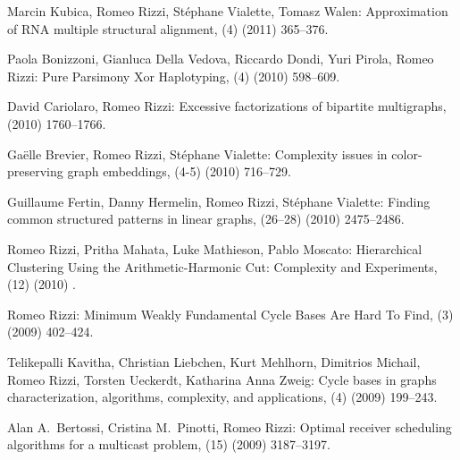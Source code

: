 \begin{etaremune}
  \item {Marcin Kubica, Romeo Rizzi, St\'ephane Vialette, Tomasz Walen:}
   \newblock Approximation of RNA multiple structural alignment,
   (4) (2011) 365--376.

  \item {\sc Paola Bonizzoni, Gianluca Della Vedova, Riccardo Dondi, Yuri Pirola, Romeo Rizzi:}
   \newblock  Pure Parsimony Xor Haplotyping,
   (4) (2010) 598--609.

  \item {\sc David Cariolaro, Romeo Rizzi:}
   \newblock  Excessive factorizations of bipartite multigraphs,
    (2010) 1760--1766.

  \item {\sc Ga\"elle Brevier, Romeo Rizzi, St\'ephane Vialette:}
   \newblock   Complexity issues in color-preserving graph embeddings,
   (4-5) (2010) 716--729.

  \item {\sc Guillaume Fertin, Danny Hermelin, Romeo Rizzi, St\'ephane Vialette:}
   \newblock  Finding common structured patterns in linear graphs,
   (26--28) (2010) 2475--2486.

  \item {\sc Romeo Rizzi, Pritha Mahata, Luke Mathieson, Pablo Moscato:}
   \newblock  Hierarchical Clustering Using the Arithmetic-Harmonic Cut: Complexity and Experiments,
   (12) (2010) .

  \item {\sc Romeo Rizzi:}
   \newblock   Minimum Weakly Fundamental Cycle Bases Are Hard To Find,
   (3) (2009) 402--424.

  \item {\sc Telikepalli Kavitha, Christian Liebchen, Kurt Mehlhorn, Dimitrios Michail, Romeo Rizzi, Torsten Ueckerdt, Katharina Anna Zweig:}
   \newblock  Cycle bases in graphs characterization, algorithms, complexity, and applications,
   (4) (2009) 199--243.

  \item {\sc Alan A.~Bertossi, Cristina M.~Pinotti, Romeo Rizzi:}
   \newblock  Optimal receiver scheduling algorithms for a multicast problem,
   (15) (2009) 3187--3197.


\end{etaremune}
